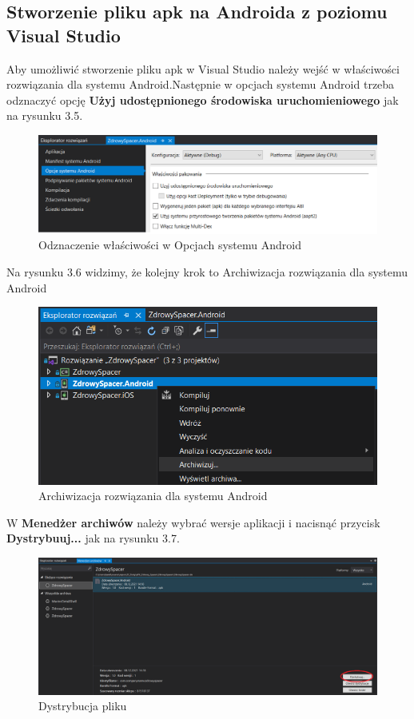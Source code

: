  \subsection{Stworzenie pliku apk na Androida z poziomu Visual Studio}
 \hspace{1cm}Aby umożliwić stworzenie pliku apk w Visual Studio należy wejść w właściwości rozwiązania dla systemu Android.Następnie w opcjach systemu Android trzeba odznaczyć opcję \textbf{Użyj udostępnionego środowiska uruchomieniowego} jak na rysunku 3.5.
 \begin{figure}[!htb]
 	\begin{center}
 		\includegraphics[width=12cm]{rys/apk_1.png}
 		\caption{Odznaczenie właściwości w Opcjach systemu Android}
 		\label{rys:rysunek007}
 	\end{center}
 \end{figure}
 \newline Na rysunku 3.6 widzimy, że kolejny krok to Archiwizacja rozwiązania dla systemu Android
 \begin{figure}[!htb]
 	\begin{center}
 		\includegraphics[width=12cm]{rys/apk_2.png}
 		\caption{Archiwizacja rozwiązania dla systemu Android}
 		\label{rys:rysunek008}
 	\end{center}
 \end{figure}
 \newline W \textbf{Menedżer archiwów} należy wybrać wersje aplikacji i nacisnąć przycisk \textbf{Dystrybuuj...} jak na rysunku 3.7.
 \begin{figure}[!htb]
 	\begin{center}
 		\includegraphics[width=12cm]{rys/apk_3.png}
 		\caption{Dystrybucja pliku}
 		\label{rys:rysunek009}
 	\end{center}
 \end{figure}
